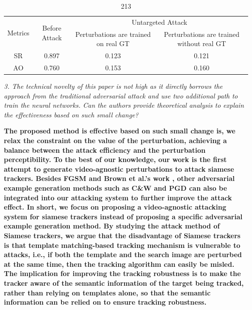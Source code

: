\documentclass[12pt]{article}
\begin{document}
\begin{table}
    \centering
    \caption{213}
    \begin{tabular}{cccc}
        \toprule
        \multirow{2}{*}{Metrics} & \multirow{2}{*}{Before Attack} & \multicolumn{2}{c}{Untargeted Attack}                                            \\
                                 &                                & Perturbations are trained on real GT & Perturbations are trained without real GT \\ \midrule
        SR                       & 0.897                          & 0.123                                & 0.121                                     \\
        AO                       & 0.760                          & 0.153                                & 0.160                                     \\                              
        \bottomrule
    \end{tabular}
    \label{tab:agent}
\end{table}

\textit{3. The technical novelty of this paper is not high as it directly borrows the approach from the traditional adversarial attack and use two additional path to train the neural networks. Can the authors provide theoretical analysis to explain the effectiveness based on such small change?}

\textbf{
The proposed method is effective based on such small change is, we relax the constraint on the value of the perturbation, achieving a balance between the attack efficiency and the perturbation perceptibility.
To the best of our knowledge, our work is the first attempt to generate video-agnostic perturbations to attack siamese trackers. Besides FGSM \cite{FGSM} and Brown et al.'s work \cite{patch}, other adversarial example generation methods such as C\&W \cite{carlini2017towards} and PGD \cite{PGD} can also be integrated into our attacking system to further improve the attack effect.
In short, we focus on proposing a video-agnostic attacking system for siamese trackers instead of proposing a specific adversarial example generation method.
By studying the attack method of Siamese trackers, we argue that the disadvantage of Siamese trackers is that template matching-based tracking mechanism is vulnerable to attacks, i.e., if both the template and the search image are perturbed at the same time, then the tracking algorithm can easily be misled.
The implication for improving the tracking robustness is to make the tracker aware of the semantic information of the target being tracked, rather than relying on templates alone, so that the semantic information can be relied on to ensure tracking robustness.}
\end{document}
